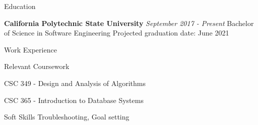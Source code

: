 \documentclass{resume}%
\begin{document}
%
\pagestyle{empty}%
\normalsize%
\begin{flushleft}%
\newcommand{\EducationEntry}[1]{
                            {\bf California Polytechnic State University}
                            \hfill
                            {\em September {#1} - Present}
                        }%
\newcommand{\BoldHeading}[1]{
                            {\bf{#1}}
                        }%
\newcommand{\DatedEntry}[2]{
                            \item{#1} 
                            \hfill
                            {\em{#2}}
                        }%
\newcommand{\FirstDatedEntry}[2]{
                            \text{#1} 
                            \hfill
                            {\em{#2}}
                        }%
\begin{rSection}{Education}%
\EducationEntry{2017}%
\linebreak%
Bachelor of Science in Software Engineering%
\linebreak%
Projected graduation date: June 2021%
\end{rSection}%
\begin{rSection}{Work Experience}%
%
\end{rSection}%
\begin{rSection}{Relevant Coursework}%
%
\item{CSC 349 {-} Design and Analysis of Algorithms}%
\item{CSC 365 {-} Introduction to Database Systems}%
\end{rSection}%
\begin{rSection}{Soft Skills}%
Troubleshooting, Goal setting%
\end{rSection}%
\end{flushleft}%
\end{document}
